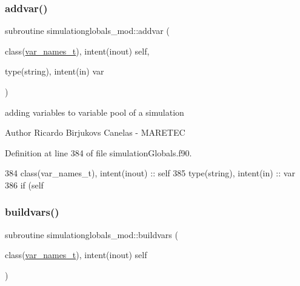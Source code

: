 \subsubsection{\texorpdfstring{addvar()}{addvar()}}
{\footnotesize\ttfamily subroutine simulationglobals\+\_\+mod\+::addvar (\begin{DoxyParamCaption}\item[{class(\mbox{\hyperlink{structsimulationglobals__mod_1_1var__names__t}{var\+\_\+names\+\_\+t}}), intent(inout)}]{self,  }\item[{type(string), intent(in)}]{var }\end{DoxyParamCaption})\hspace{0.3cm}{\ttfamily [private]}}



adding variables to variable pool of a simulation 

\begin{DoxyAuthor}{Author}
Ricardo Birjukovs Canelas -\/ M\+A\+R\+E\+T\+EC 
\end{DoxyAuthor}


Definition at line 384 of file simulation\+Globals.\+f90.


\begin{DoxyCode}
384     \textcolor{keywordtype}{class}(var\_names\_t), \textcolor{keywordtype}{intent(inout)} :: self
385     \textcolor{keywordtype}{type}(string), \textcolor{keywordtype}{intent(in)} :: var
386     \textcolor{keywordflow}{if} (self%
\end{DoxyCode}
\mbox{\label{namespacesimulationglobals__mod_a4aa829af1699c705e46f47bb023ac162}} 
\subsubsection{\texorpdfstring{buildvars()}{buildvars()}}
{\footnotesize\ttfamily subroutine simulationglobals\+\_\+mod\+::buildvars (\begin{DoxyParamCaption}\item[{class(\mbox{\hyperlink{structsimulationglobals__mod_1_1var__names__t}{var\+\_\+names\+\_\+t}}), intent(inout)}]{self }\end{DoxyParamCaption})\hspace{0.3cm}{\ttfamily [private]}}



